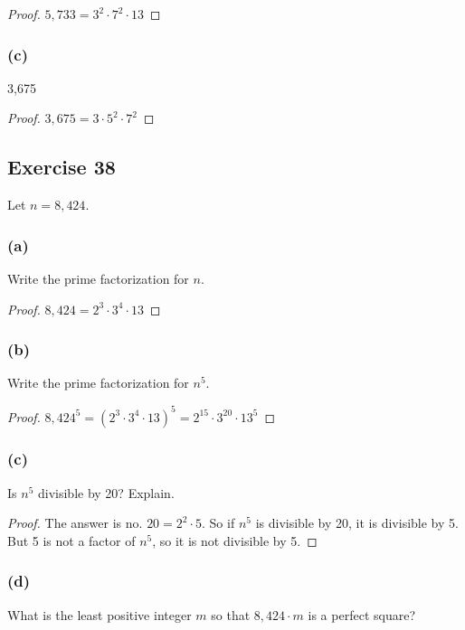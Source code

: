 \documentclass[14pt]{extarticle}
\begin{document}
\begin{proof}
$5,733 = 3^2 \cdot 7^2 \cdot 13$
\end{proof}

\subsubsection{(c)}
3,675

\begin{proof}
$3,675 = 3 \cdot 5^2 \cdot 7^2$
\end{proof}

\subsection{Exercise 38}
Let $n = 8,424$.

\subsubsection{(a)}
Write the prime factorization for $n$.

\begin{proof}
$8,424 = 2^3 \cdot 3^4 \cdot 13$
\end{proof}

\subsubsection{(b)}
Write the prime factorization for $n^5$.

\begin{proof}
$8,424^5 = (2^3 \cdot 3^4 \cdot 13)^5 = 2^{15} \cdot 3^{20} \cdot 13^5$
\end{proof}

\subsubsection{(c)}
Is $n^5$ divisible by 20? Explain.

\begin{proof}
The answer is no. $20 = 2^2 \cdot 5$. So if $n^5$ is divisible by 20, it is divisible by 5. But 5 is not a factor of $n^5$, so it is not divisible by 5.
\end{proof}

\subsubsection{(d)}
What is the least positive integer $m$ so that $8,424\cdot m$ is a perfect square?
\end{document}
